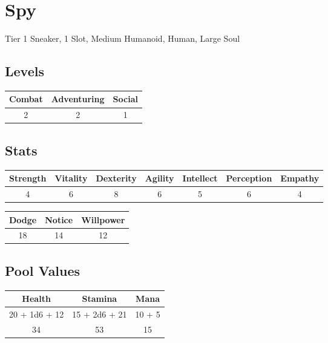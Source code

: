 \section{Spy}
Tier 1 Sneaker, 1 Slot, Medium Humanoid, Human, Large Soul\\

\subsection{Levels}
\begin{minipage}[H]{1\textwidth}
	\centering
	\begin{tabular}[c]{|c | c | c|}
		\hline
		Combat & Adventuring & Social\\
		\hline
		2 & 2 & 1\\
		\hline
	\end{tabular}
\end{minipage}

\subsection{Stats}
\begin{minipage}[H]{1\textwidth}
	\centering
	\begin{tabular}[c]{|c | c | c | c | c | c | c|}
		\hline
		Strength & Vitality & Dexterity & Agility & Intellect & Perception & Empathy\\
		\hline
		4 & 6 & 8 & 6 & 5 & 6 & 4\\
		\hline
	\end{tabular}
\end{minipage}
\bigbreak

\begin{minipage}[H]{1\textwidth}
	\centering
	\begin{tabular}[c]{|c | c | c|}
		\hline
		Dodge & Notice & Willpower\\
		\hline
		18 & 14 & 12\\
		\hline
	\end{tabular}
\end{minipage}

\subsection{Pool Values}
\bigbreak
\begin{minipage}[H]{1\textwidth}
	\centering
	\begin{tabular}[c]{|c | c | c|}
		\hline
		Health & Stamina & Mana\\
		\hline
		20 + 1d6 + 12 & 15 + 2d6 + 21 & 10 + 5 \\
		34 & 53 & 15\\
		\hline
	\end{tabular}
\end{minipage}
\noindent

